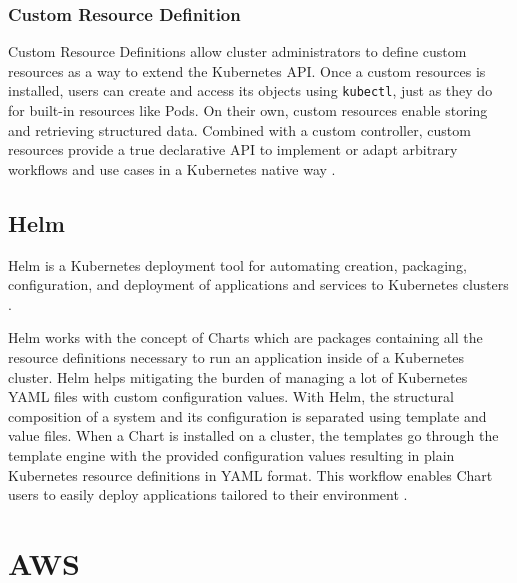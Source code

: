 \subsubsection{Custom Resource Definition}

Custom Resource Definitions allow cluster administrators to define custom resources as a way to extend the Kubernetes API. Once a custom resources is installed, users can create and access its objects using \texttt{kubectl}, just as they do for built-in resources like Pods. On their own, custom resources enable storing and retrieving structured data. Combined with a custom controller, custom resources provide a true declarative API to implement or adapt arbitrary workflows and use cases in a Kubernetes native way \cite{KubernetesCRD}.

\subsection{Helm} \label{helm}

Helm is a Kubernetes deployment tool for automating creation, packaging, configuration, and deployment of applications and services to Kubernetes clusters \cite{HelmWhatIs}.

Helm works with the concept of Charts which are packages containing all the resource definitions necessary to run an application inside of a Kubernetes cluster. Helm helps mitigating the burden of managing a lot of Kubernetes YAML files with custom configuration values. With Helm, the structural composition of a system and its configuration is separated using template and value files. When a Chart is installed on a cluster, the templates go through the template engine with the provided configuration values resulting in plain Kubernetes resource definitions in YAML format.  This workflow enables Chart users to easily deploy applications tailored to their environment \cite{Helm}.

\section{AWS}

